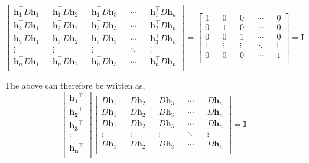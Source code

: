 \documentclass[english]{article}
\theoremstyle{plain}
\begin{document}
\begin{equation}
\begin{bmatrix}
\boldsymbol{h}_{1}^{\top}D\boldsymbol{h}_{1} && \boldsymbol{h}_{1}^{\top}D\boldsymbol{h}_{2} && \boldsymbol{h}_{1}^{\top}D\boldsymbol{h}_{3} && \cdots &&
\boldsymbol{h}_{1}^{\top}D\boldsymbol{h}_{n} \\
\boldsymbol{h}_{2}^{\top}D\boldsymbol{h}_{1} && \boldsymbol{h}_{2}^{\top}D\boldsymbol{h}_{2} && \boldsymbol{h}_{2}^{\top}D\boldsymbol{h}_{3} && \cdots &&
\boldsymbol{h}_{2}^{\top}D\boldsymbol{h}_{n} \\
\boldsymbol{h}_{3}^{\top}D\boldsymbol{h}_{1} && \boldsymbol{h}_{3}^{\top}D\boldsymbol{h}_{2} && \boldsymbol{h}_{3}^{\top}D\boldsymbol{h}_{3} && \cdots &&
\boldsymbol{h}_{3}^{\top}D\boldsymbol{h}_{n} \\
\vdots && \vdots && \vdots && \ddots && \vdots \\
\boldsymbol{h}_{n}^{\top}D\boldsymbol{h}_{1} && \boldsymbol{h}_{n}^{\top}D\boldsymbol{h}_{2} && \boldsymbol{h}_{n}^{\top}D\boldsymbol{h}_{3} && \cdots &&
\boldsymbol{h}_{n}^{\top}D\boldsymbol{h}_{n} \\
\end{bmatrix} = 
\begin{bmatrix}
1 && 0 && 0 && \cdots && 0 \\
0 && 1 && 0 && \cdots && 0 \\
0 && 0 && 1 && \cdots && 0 \\
\vdots && \vdots && \vdots && \ddots && \vdots \\
0 && 0 && 0 && \cdots && 1 \\
\end{bmatrix} = \boldsymbol{I}
\end{equation}

The above can therefore be written as,
\begin{equation}
\begin{bmatrix}
\boldsymbol{h_{1}}^{\top} \\
\boldsymbol{h_{2}}^{\top} \\
\boldsymbol{h_{3}}^{\top} \\
\vdots \\
\boldsymbol{h_{n}}^{\top} \\
\end{bmatrix}
\begin{bmatrix}
D\boldsymbol{h}_{1} && 
D\boldsymbol{h}_{2} && 
D\boldsymbol{h}_{3} && \cdots &&
D\boldsymbol{h}_{n} \\
D\boldsymbol{h}_{1} && 
D\boldsymbol{h}_{2} && 
D\boldsymbol{h}_{3} && \cdots &&
D\boldsymbol{h}_{n} \\
D\boldsymbol{h}_{1} && 
D\boldsymbol{h}_{2} && 
D\boldsymbol{h}_{3} && \cdots &&
D\boldsymbol{h}_{n} \\
\vdots && \vdots && \vdots && \ddots && \vdots \\
D\boldsymbol{h}_{1} && 
D\boldsymbol{h}_{2} && 
D\boldsymbol{h}_{3} && \cdots &&
D\boldsymbol{h}_{n} \\
\end{bmatrix}
= \boldsymbol{I}
\end{equation}
\end{document}
